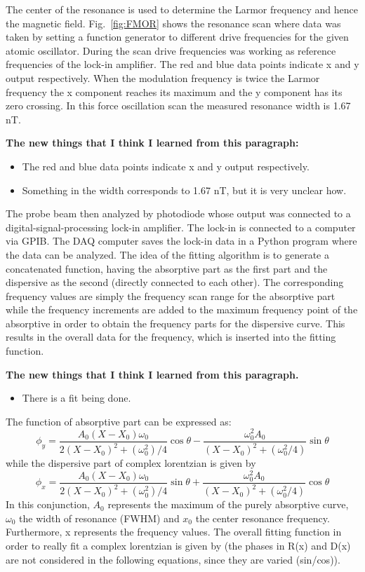 The center of the resonance is used to determine the Larmor frequency
and hence the magnetic field.  Fig.~\ref{fig:FMOR} shows the resonance
scan where data was taken by setting a function generator to different
drive frequencies for the given atomic oscillator. During the scan
drive frequencies was working as reference frequencies of the lock-in
amplifier. The red and blue data points indicate x and y output
respectively. When the modulation frequency is twice the Larmor
frequency the x component reaches its maximum and the y component has
its zero crossing. In this force oscillation scan the measured
resonance width is 1.67 nT.

{\bf The new things that I think I learned from this paragraph:}
\begin{itemize}
\item The red and blue data points indicate x and y output
respectively.
\item Something in the width corresponds to 1.67 nT, but it is very
  unclear how.
\end{itemize}

The probe beam then analyzed by photodiode whose output was connected
to a digital-signal-processing lock-in amplifier. The lock-in is
connected to a computer via GPIB. The DAQ computer saves the lock-in
data in a Python program where the data can be analyzed. The idea of
the fitting algorithm is to generate a concatenated function, having
the absorptive part as the first part and the dispersive as the second
(directly connected to each other). The corresponding frequency values
are simply the frequency scan range for the absorptive part while the
frequency increments are added to the maximum frequency point of the
absorptive in order to obtain the frequency parts for the dispersive
curve. This results in the overall data for the frequency, which is
inserted into the fitting function.

{\bf The new things that I think I learned from this paragraph.}
\begin{itemize}
\item There is a fit being done.
\end{itemize}


The function of absorptive part can be expressed as:
\begin{equation}
\phi_y= \frac{A_0 (X-X_0 )\omega_0}{2(X-X_0 )^2+(\omega_0^2)/4}\cos\theta-\frac{\omega_0^2A_0}{(X-X_0 )^2+(\omega_0^2/4)}\sin\theta
\end{equation}
while the dispersive part of complex lorentzian is given by
\begin{equation}
\phi_x= \frac{A_0 (X-X_0 )\omega_0}{2(X-X_0 )^2+(\omega_0^2)/4}\sin\theta+\frac{\omega_0^2A_0}{(X-X_0 )^2+(\omega_0^2/4)}\cos\theta
\end{equation}
In this conjunction, $A_0$ represents the maximum of the purely
absorptive curve, $\omega_0$ the width of resonance (FWHM) and $x_0$
the center resonance frequency. Furthermore, x represents the
frequency values.  The overall fitting function in order to really fit
a complex lorentzian is given by (the phases in R(x) and D(x) are not
considered in the following equations, since they are varied
(sin/cos)).

